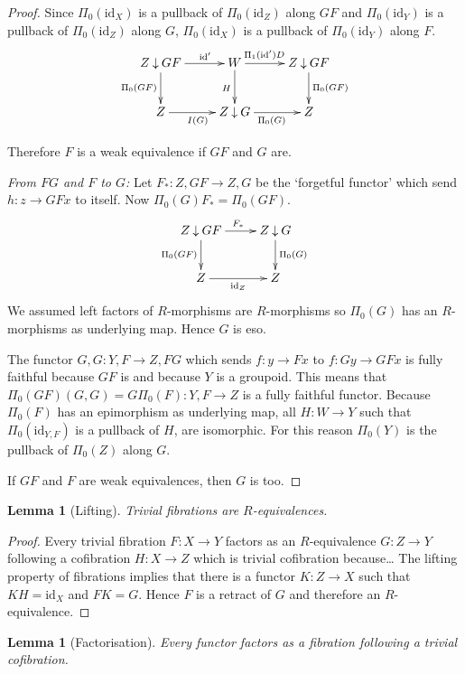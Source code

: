 \documentclass{amsart}
\theoremstyle{plain}
\newtheorem{lemma}[theorem]{Lemma}
\theoremstyle{definition}
\newcommand\id{\mathrm{id}}
\begin{document}
\begin{proof}
Since $\Pi_0(\id_X)$ is a pullback of $\Pi_0(\id_Z)$ along $GF$ and $\Pi_0(\id_Y)$ is a pullback of $\Pi_0(\id_Z)$ along $G$, $\Pi_0(\id_X)$ is a pullback of $\Pi_0(\id_Y)$ along $F$.
\[ \xymatrix{
Z\comma GF \ar[r]^(.6){\id'}\ar[d]_{\Pi_0(GF)} & W \ar[r]^(.4){\Pi_1(\id')D}\ar[d]_H & Z\comma GF\ar[d]^{\Pi_0(GF)} \\
Z \ar[r]_{I(G)} & Z\comma G \ar[r]_{\Pi_0(G)} & Z 
}\]

Therefore $F$ is a weak equivalence if $GF$ and $G$ are.

\emph{From $FG$ and $F$ to $G$:} Let $F_*:Z\comma GF \to Z\comma G$ be the `forgetful functor' which send $h:z\to GFx$ to itself. Now $\Pi_0(G)F_* = \Pi_0(GF)$.
\[ \xymatrix{
Z\comma GF \ar[r]^{F_*} \ar[d]_{\Pi_0(GF)} & Z\comma G \ar[d]^{\Pi_0(G)}\\
Z \ar[r]_{\id_Z} & Z
}\]
We assumed left factors of $R$-morphisms are $R$-morphisms so $\Pi_0(G)$ has an $R$-morphisms as underlying map. Hence $G$ is eso.

The functor $G\comma G: Y\comma F \to Z\comma FG$ which sends $f:y\to Fx$ to $f:Gy \to GFx$ is fully faithful because $GF$ is and because $Y$ is a groupoid.
This means that $\Pi_0(GF)(G\comma G) = G\Pi_0(F): Y\comma F\to Z$ is a fully faithful functor. Because $\Pi_0(F)$ has an epimorphism as underlying map, all $H:W\to Y$ such that $\Pi_0(\id_{Y\comma F})$ is a pullback of $H$, are isomorphic. For this reason $\Pi_0(Y)$ is the pullback of $\Pi_0(Z)$ along $G$.

If $GF$ and $F$ are weak equivalences, then $G$ is too.
\end{proof}


\begin{lemma}[Lifting] Trivial fibrations are $R$-equivalences. \label{lift}\end{lemma}

\begin{proof} Every trivial fibration $F:X\to Y$ factors as an $R$-equivalence $G:Z\to Y$ following a cofibration $H:X\to Z$ which is trivial cofibration because\dots %
The lifting property of fibrations implies that there is a functor $K:Z\to X$ such that $KH = \id_X$ and $FK=G$. Hence $F$ is a retract of $G$ and therefore an $R$-equivalence.
\end{proof}


\begin{lemma}[Factorisation] Every functor factors as a fibration following a trivial cofibration. \label{factor}\end{lemma}
\end{document}
